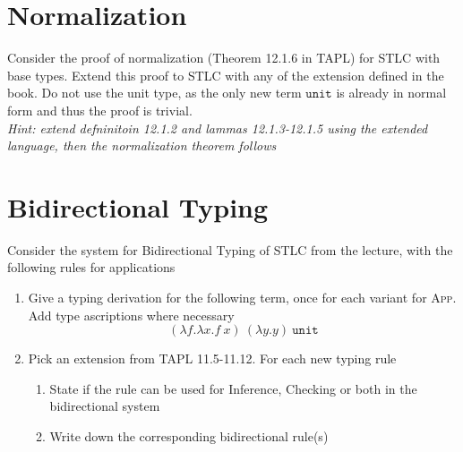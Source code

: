 \section{Normalization}
Consider the proof of normalization (Theorem 12.1.6 in TAPL) for STLC with base types.
Extend this proof to STLC with any of the extension defined in the book. 
Do not use the unit type, as the only new term $\mathtt{unit}$ is already in normal form and thus the proof is trivial.\\
\emph{Hint: extend defninitoin 12.1.2 and lammas 12.1.3-12.1.5 using the extended language, then the normalization theorem follows}

\section{Bidirectional Typing}
Consider the system for Bidirectional Typing of STLC from the lecture, with the following rules for applications\\
\begin{minipage}{\textwidth}
  \begin{minipage}{0.45\textwidth}
    \begin{prooftree}
    \end{prooftree}
  \end{minipage}
  \hfill
  \begin{minipage}{0.45\textwidth}
    \begin{prooftree}
    \end{prooftree}
    \hfill
  \end{minipage}
  \hfill
  \vspace{2em}
\end{minipage}
\begin{enumerate}
  \item Give a typing derivation for the following term, once for each variant for \textsc{App}. Add type ascriptions where necessary\\
    $$ (\lambda f. \lambda x. f\ x)\ (\lambda y.y)\ \mathtt{unit}$$
  \item Pick an extension from TAPL 11.5-11.12. For each new typing rule
    \begin{enumerate}
      \item State if the rule can be used for Inference, Checking or both in the bidirectional system 
      \item Write down the corresponding bidirectional rule(s)
    \end{enumerate}
\end{enumerate}

